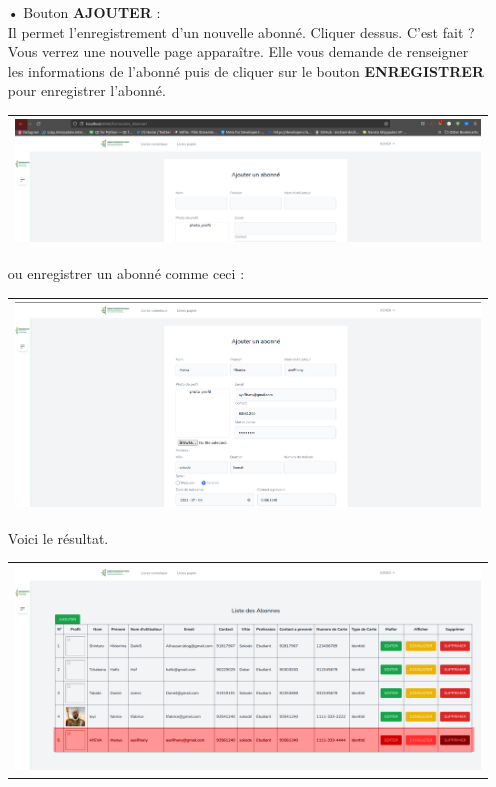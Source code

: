 \documentclass[12pt,a4paper]{article}
\begin{document}
\begin{itemize}
\item[•] Bouton \textbf{AJOUTER} : \\
Il permet l'enregistrement d'un nouvelle abonné. Cliquer dessus. C'est fait ? Vous verrez
une nouvelle page apparaître. Elle vous demande de renseigner les informations de l'abonné
puis de cliquer sur le bouton \textbf{ENREGISTRER} pour enregistrer l'abonné.
\begin{center}
\begin{tabular}{|p{17cm}|}
\hline 
\includegraphics[width=\textwidth]{img/back.png} \\ 
\hline 
\end{tabular} 
\end{center}
ou enregistrer un abonné comme ceci  :\\
\begin{center}
\begin{tabular}{|p{17cm}|}
\hline 
\includegraphics[width=\textwidth]{img/save_abonne.png} \\ 
\hline 
\end{tabular} 
\end{center}
Voici le résultat.\\
\begin{center}
\begin{tabular}{|p{17cm}|}
\hline 
\includegraphics[width=\textwidth]{img/abonnes_2.png} \\ 

\end{tabular}
\end{center}
\end{itemize}
\end{document}
